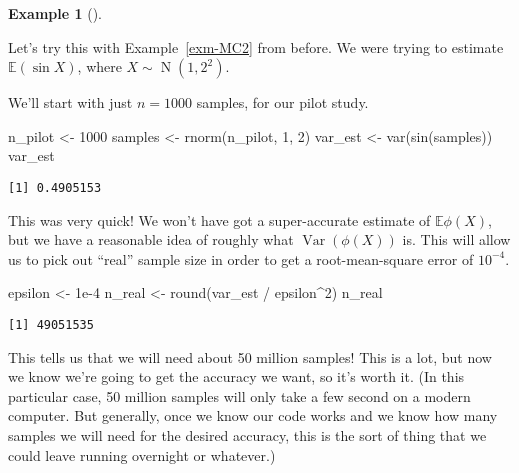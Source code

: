 \documentclass[
  letterpaper,
  DIV=11,
  numbers=noendperiod]{scrreprt}
\newenvironment{Shaded}{\begin{snugshade}}{\end{snugshade}}
\newcommand{\DecValTok}[1]{\textcolor[rgb]{0.68,0.00,0.00}{#1}}
\newcommand{\FloatTok}[1]{\textcolor[rgb]{0.68,0.00,0.00}{#1}}
\newcommand{\FunctionTok}[1]{\textcolor[rgb]{0.28,0.35,0.67}{#1}}
\newcommand{\NormalTok}[1]{\textcolor[rgb]{0.00,0.23,0.31}{#1}}
\newcommand{\OtherTok}[1]{\textcolor[rgb]{0.00,0.23,0.31}{#1}}
\newcommand{\SpecialCharTok}[1]{\textcolor[rgb]{0.37,0.37,0.37}{#1}}
\theoremstyle{plain}
\theoremstyle{definition}
\theoremstyle{definition}
\newtheorem{example}{Example}[chapter]
\theoremstyle{remark}
\begin{document}
\begin{example}[]\protect\hypertarget{exm-MC22}{}\label{exm-MC22}

Let's try this with Example~\ref{exm-MC2} from before. We were trying to
estimate \(\mathbb{E}(\sin X)\), where
\(X \sim \operatorname{N}(1, 2^2)\).

We'll start with just \(n = 1000\) samples, for our pilot study.

\begin{Shaded}
\begin{Highlighting}[]
\NormalTok{n\_pilot }\OtherTok{\textless{}{-}} \DecValTok{1000}
\NormalTok{samples }\OtherTok{\textless{}{-}} \FunctionTok{rnorm}\NormalTok{(n\_pilot, }\DecValTok{1}\NormalTok{, }\DecValTok{2}\NormalTok{)}
\NormalTok{var\_est }\OtherTok{\textless{}{-}} \FunctionTok{var}\NormalTok{(}\FunctionTok{sin}\NormalTok{(samples))}
\NormalTok{var\_est}
\end{Highlighting}
\end{Shaded}

\begin{verbatim}
[1] 0.4905153
\end{verbatim}

This was very quick! We won't have got a super-accurate estimate of
\(\mathbb E\phi(X)\), but we have a reasonable idea of roughly what
\(\operatorname{Var}(\phi(X))\) is. This will allow us to pick out
``real'' sample size in order to get a root-mean-square error of
\(10^{-4}\).

\begin{Shaded}
\begin{Highlighting}[]
\NormalTok{epsilon }\OtherTok{\textless{}{-}} \FloatTok{1e{-}4}
\NormalTok{n\_real  }\OtherTok{\textless{}{-}} \FunctionTok{round}\NormalTok{(var\_est }\SpecialCharTok{/}\NormalTok{ epsilon}\SpecialCharTok{\^{}}\DecValTok{2}\NormalTok{)}
\NormalTok{n\_real}
\end{Highlighting}
\end{Shaded}

\begin{verbatim}
[1] 49051535
\end{verbatim}

This tells us that we will need about 50 million samples! This is a lot,
but now we know we're going to get the accuracy we want, so it's worth
it. (In this particular case, 50 million samples will only take a few
second on a modern computer. But generally, once we know our code works
and we know how many samples we will need for the desired accuracy, this
is the sort of thing that we could leave running overnight or whatever.)


\end{example}
\end{document}
